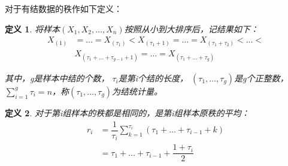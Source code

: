 \documentclass[UTF8]{ctexart}
\numberwithin{equation}{section}
\newtheorem{definition}{定义}[section]
\begin{document}
对于有结数据的秩作如下定义：
\begin{definition}
    将样本$(X_1, X_2,\dots, X_n)$按照从小到大排序后，记结果如下：
    \begin{equation}
        \begin{split}
            X_{(1)} 
            & = \dots = X_{(\tau_1)} < X_{(\tau_1+1)} = 
            \dots = X_{(\tau_1+\tau_2)} < \dots < \\
            & X_{(\tau_1+\dots+\tau_{g-1}+1)} = \dots 
            = X_{(\tau_1+\dots+\tau_{g})}
        \end{split}
        \nonumber
    \end{equation}

    其中，g是样本中结的个数，
    $\tau_i$是第i个结的长度，
    $(\tau_1,\dots,\tau_g)$是g个正整数，
    $\sum_{i=1}^g \tau_i = n$，称$(\tau_1,\dots,\tau_g)$为结统计量。
\end{definition}
\begin{definition}
    对于第i组样本的秩都是相同的，是第i组样本原秩的平均：
    \begin{equation}
        \begin{split}
            r_i 
            & = \dfrac{1}{\tau_i} \sum_{k=1}^{\tau_i} (\tau_1 + \dots + \tau_{i-1} + k) \\
            & = \tau_1 + \dots + \tau_{i-1} + \dfrac{1+\tau_i}{2}
        \end{split}
    \end{equation}
\end{definition}
\end{document}
